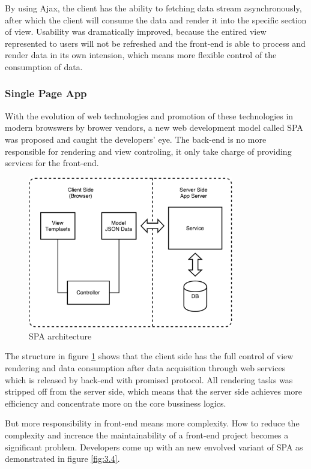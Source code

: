 By using Ajax, the client has the ability to fetching data stream asynchronously, after which the client will consume the data and render it into the specific section of view. Usability was dramatically improved, because the entired view represented to users will not be refreshed and the front-end is able to process and render data in its own intension, which means more flexible control of the consumption of data.

\subsubsection{Single Page App}

With the evolution of web technologies and promotion of these technologies in modern browswers by brower vendors, a new web development model called \gls{SPA} was proposed and caught the developers' eye. The back-end is no more responsible for rendering and view controling, it only take charge of providing services for the front-end.

\begin{figure}[!htbp]
  \centering
    \includegraphics[width=0.8\textwidth]{Figures/tech-web-arch-spa.pdf}
  \caption{SPA architecture}
  \label{fig:3.3}
\end{figure}

The structure in figure \ref{fig:3.3} shows that the client side has the full control of view rendering and data consumption after data acquisition through web services which is released by back-end with promised protocol. All rendering tasks was stripped off from the server side, which means that the server side achieves more efficiency and concentrate more on the core bussiness logics.

But more responsibility in front-end means more complexity. How to reduce the complexity and increace the maintainability of a front-end project becomes a significant problem. Developers come up with an new envolved variant of SPA as demonstrated in figure \ref{fig:3.4}.

